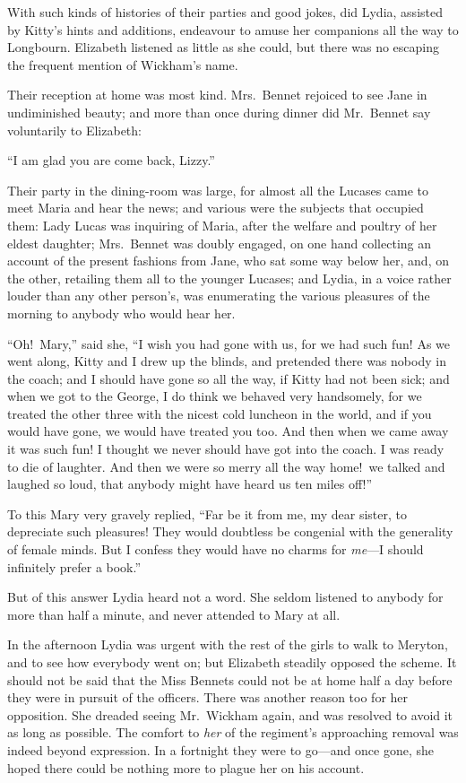 \documentclass[12pt,english,oneside]{book}
\begin{document}
With such kinds of histories of their parties and good jokes, did
Lydia, assisted by Kitty's hints and additions, endeavour to amuse
her companions all the way to Longbourn. Elizabeth listened as little
as she could, but there was no escaping the frequent mention of Wickham's
name.

Their reception at home was most kind. Mrs.\ Bennet rejoiced to see
Jane in undiminished beauty; and more than once during dinner did
Mr.\ Bennet say voluntarily to Elizabeth:

{}``I am glad you are come back, Lizzy.''

Their party in the dining-room was large, for almost all the Lucases
came to meet Maria and hear the news; and various were the subjects
that occupied them: Lady Lucas was inquiring of Maria, after the welfare
and poultry of her eldest daughter; Mrs.\ Bennet was doubly engaged,
on one hand collecting an account of the present fashions from Jane,
who sat some way below her, and, on the other, retailing them all
to the younger Lucases; and Lydia, in a voice rather louder than any
other person's, was enumerating the various pleasures of the morning
to anybody who would hear her.

{}``Oh!\ Mary,'' said she, {}``I wish you had gone with us, for
we had such fun! As we went along, Kitty and I drew up the blinds,
and pretended there was nobody in the coach; and I should have gone
so all the way, if Kitty had not been sick; and when we got to the
George, I do think we behaved very handsomely, for we treated the
other three with the nicest cold luncheon in the world, and if you
would have gone, we would have treated you too. And then when we came
away it was such fun! I thought we never should have got into the
coach. I was ready to die of laughter. And then we were so merry all
the way home!\ we talked and laughed so loud, that anybody might
have heard us ten miles off!''\ 

To this Mary very gravely replied, {}``Far be it from me, my dear
sister, to depreciate such pleasures! They would doubtless be congenial
with the generality of female minds. But I confess they would have
no charms for \textit{me}---I should infinitely prefer a book.''

But of this answer Lydia heard not a word. She seldom listened to
anybody for more than half a minute, and never attended to Mary at
all.

In the afternoon Lydia was urgent with the rest of the girls to walk
to Meryton, and to see how everybody went on; but Elizabeth steadily
opposed the scheme. It should not be said that the Miss Bennets could
not be at home half a day before they were in pursuit of the officers.
There was another reason too for her opposition. She dreaded seeing
Mr.\ Wickham again, and was resolved to avoid it as long as possible.
The comfort to \textit{her} of the regiment's approaching removal
was indeed beyond expression. In a fortnight they were to go\mbox{---}and
once gone, she hoped there could be nothing more to plague her on
his account.
\end{document}
